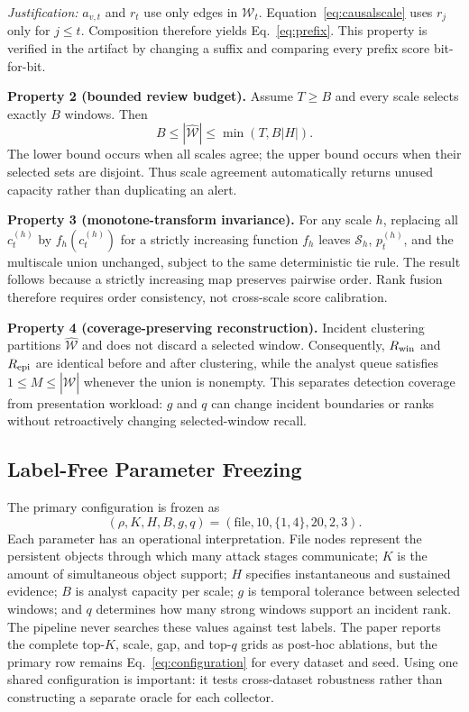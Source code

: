 \documentclass[lettersize,journal]{IEEEtran}
\begin{document}
\emph{Justification:} $a_{v,t}$ and $r_t$ use only edges in $\mathcal W_t$.
Equation~\eqref{eq:causalscale} uses $r_j$ only for $j\leq t$.  Composition
therefore yields Eq.~\eqref{eq:prefix}.  This property is verified in the
artifact by changing a suffix and comparing every prefix score bit-for-bit.

\noindent\textbf{Property 2 (bounded review budget).}
Assume $T\geq B$ and every scale selects exactly $B$ windows.  Then
\begin{equation}
 B\leq |\widehat{\mathcal W}|\leq \min(T,B|H|).
 \label{eq:budgetbound}
\end{equation}
The lower bound occurs when all scales agree; the upper bound occurs when their
selected sets are disjoint.  Thus scale agreement automatically returns unused
capacity rather than duplicating an alert.

\noindent\textbf{Property 3 (monotone-transform invariance).}
For any scale $h$, replacing all $c_t^{(h)}$ by
$f_h(c_t^{(h)})$ for a strictly increasing function $f_h$ leaves
$\mathcal S_h$, $p_t^{(h)}$, and the multiscale union unchanged, subject to the
same deterministic tie rule.  The result follows because a strictly increasing
map preserves pairwise order.  Rank fusion therefore requires order consistency,
not cross-scale score calibration.

\noindent\textbf{Property 4 (coverage-preserving reconstruction).}
Incident clustering partitions $\widehat{\mathcal W}$ and does not discard a
selected window.  Consequently, $R_{\rm win}$ and $R_{\rm epi}$ are identical
before and after clustering, while the analyst queue satisfies
$1\leq M\leq|\widehat{\mathcal W}|$ whenever the union is nonempty.  This
separates detection coverage from presentation workload: $g$ and $q$ can change
incident boundaries or ranks without retroactively changing selected-window
recall.

\subsection{Label-Free Parameter Freezing}

The primary configuration is frozen as
\begin{equation}
 (\rho,K,H,B,g,q)=(\text{file},10,\{1,4\},20,2,3).
 \label{eq:configuration}
\end{equation}
Each parameter has an operational interpretation.  File nodes represent the
persistent objects through which many attack stages communicate; $K$ is the
amount of simultaneous object support; $H$ specifies instantaneous and sustained
evidence; $B$ is analyst capacity per scale; $g$ is temporal tolerance between
selected windows; and $q$ determines how many strong windows support an incident
rank.  The pipeline never searches these values against test labels.  The paper
reports the complete top-$K$, scale, gap, and top-$q$ grids as post-hoc ablations,
but the primary row remains Eq.~\eqref{eq:configuration} for every dataset and
seed.  Using one shared configuration is important: it tests cross-dataset
robustness rather than constructing a separate oracle for each collector.
\end{document}
